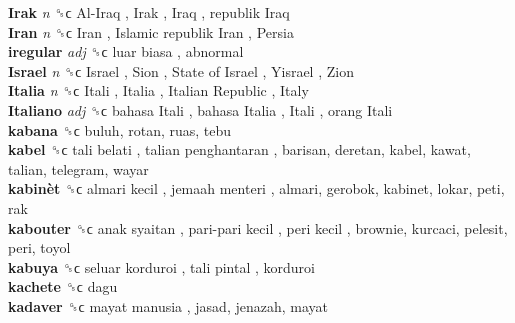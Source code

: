 \textbf{Irak} \emph{n}  ␝ϲ   Al-Iraq ,  Irak ,  Iraq ,  republik Iraq   \\
\textbf{Iran} \emph{n}  ␝ϲ   Iran ,  Islamic republik Iran ,  Persia   \\
\textbf{iregular} \emph{adj}  ␝ϲ   luar biasa , abnormal  \\
\textbf{Israel} \emph{n}  ␝ϲ   Israel ,  Sion ,  State of Israel ,  Yisrael ,  Zion   \\
\textbf{Italia} \emph{n}  ␝ϲ   Itali ,  Italia ,  Italian Republic ,  Italy   \\
\textbf{Italiano} \emph{adj}  ␝ϲ   bahasa Itali ,  bahasa Italia ,  Itali ,  orang Itali   \\
\textbf{kabana} ␝ϲ  buluh, rotan, ruas, tebu  \\
\textbf{kabel} ␝ϲ   tali belati ,  talian penghantaran , barisan, deretan, kabel, kawat, talian, telegram, wayar  \\
\textbf{kabinèt} ␝ϲ   almari kecil ,  jemaah menteri , almari, gerobok, kabinet, lokar, peti, rak  \\
\textbf{kabouter} ␝ϲ   anak syaitan ,  pari-pari kecil ,  peri kecil , brownie, kurcaci, pelesit, peri, toyol  \\
\textbf{kabuya} ␝ϲ   seluar korduroi ,  tali pintal , korduroi  \\
\textbf{kachete} ␝ϲ  dagu  \\
\textbf{kadaver} ␝ϲ   mayat manusia , jasad, jenazah, mayat  \\
